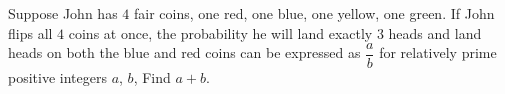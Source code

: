 Suppose John has $4$ fair coins, one red, one blue, one yellow, one green. If John  flips all $4$ coins at once, the probability he will land exactly $3$ heads and land heads on both the blue and red coins can be expressed as $\dfrac{a}{b}$ for relatively prime positive integers $a$, $b$, Find $a + b$.
